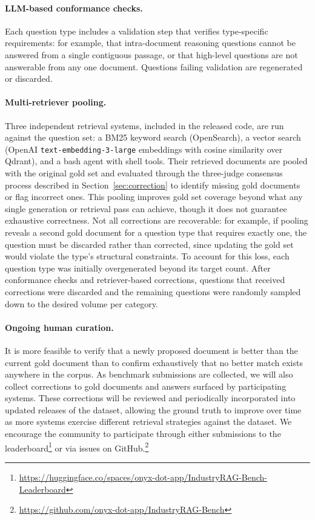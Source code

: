 \documentclass{article}
\begin{document}
\paragraph{LLM-based conformance checks.}
Each question type includes a validation step that verifies type-specific requirements: for example, that intra-document reasoning questions cannot be answered from a single contiguous passage, or that high-level questions are not answerable from any one document. Questions failing validation are regenerated or discarded.

\paragraph{Multi-retriever pooling.}
Three independent retrieval systems, included in the released code, are run against the question set: a BM25 keyword search (OpenSearch), a vector search (OpenAI \texttt{text-embedding-3-large} embeddings with cosine similarity over Qdrant), and a bash agent with shell tools. Their retrieved documents are pooled with the original gold set and evaluated through the three-judge consensus process described in Section~\ref{sec:correction} to identify missing gold documents or flag incorrect ones. This pooling improves gold set coverage beyond what any single generation or retrieval pass can achieve, though it does not guarantee exhaustive correctness. Not all corrections are recoverable: for example, if pooling reveals a second gold document for a question type that requires exactly one, the question must be discarded rather than corrected, since updating the gold set would violate the type's structural constraints. To account for this loss, each question type was initially overgenerated beyond its target count. After conformance checks and retriever-based corrections, questions that received corrections were discarded and the remaining questions were randomly sampled down to the desired volume per category.

\paragraph{Ongoing human curation.}
It is more feasible to verify that a newly proposed document is better than the current gold document than to confirm exhaustively that no better match exists anywhere in the corpus. As benchmark submissions are collected, we will also collect corrections to gold documents and answers surfaced by participating systems. These corrections will be reviewed and periodically incorporated into updated releases of the dataset, allowing the ground truth to improve over time as more systems exercise different retrieval strategies against the dataset. We encourage the community to participate through either submissions to the leaderboard\footnote{\url{https://huggingface.co/spaces/onyx-dot-app/IndustryRAG-Bench-Leaderboard}} or via issues on GitHub.\footnote{\url{https://github.com/onyx-dot-app/IndustryRAG-Bench}}
\end{document}
